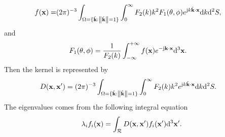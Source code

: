 \documentclass[12pt,draftclsnofoot,journal,onecolumn]{IEEEtran}
\begin{document}
	\begin{equation}
		\begin{aligned}
			f({\bf x})=&(2\pi)^{-3}\int_{{\Omega}=\{\hat{\bf k}: \left\| \hat{\bf k} \right\|=1\}}\int_{0}^{\infty}F_2(k)k^2F_1(\theta,\phi)e^{{\rm j}k\hat{\bf k}\cdot {\bf x}}{\rm d}k{\rm d}^2S,
		\end{aligned}
	\end{equation}
	and
	\begin{equation}
		\begin{aligned}
			F_1(\theta,\phi) &= 
			\frac{1}{F_2(k)} \int_{-\infty}^{+\infty}f({\bf x})e^{-{\rm j}{\bf k}\cdot {\bf x}}{\rm d}^3{\bf x}.
		\end{aligned}
	\end{equation}
	Then the kernel is represented by 
	\begin{equation}
		\begin{aligned}
			D({\bf x},{\bf x}') &= (2\pi)^{-3}\int_{{\Omega}=\{\hat{\bf k}: \left\| \hat{\bf k} \right\|=1\}}\int_{0}^{\infty}F_2(k)k^2e^{{\rm j}k\hat{\bf k}\cdot {\bf x}}{\rm d}k{\rm d}^2S.
		\end{aligned}
	\end{equation}
	The eigenvalues comes from the following integral equation
	\begin{equation}
		\lambda_i f_i({\bf x}) = \int_{\mathcal{R}}D({\bf x},{\bf x}')f_i({\bf x}'){\rm d}^3{\bf x}'.
		\label{eigenfunction_3d}
	\end{equation}
\end{document}
